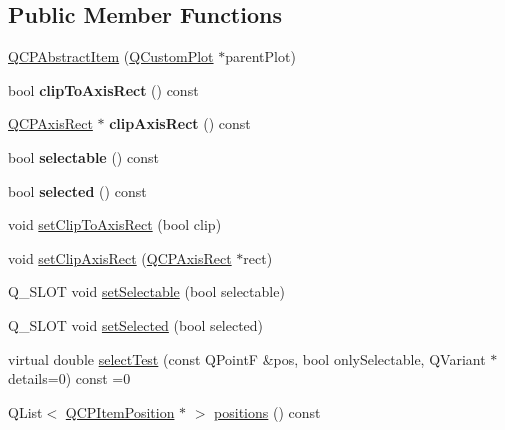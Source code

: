 \subsection*{Public Member Functions}
\begin{DoxyCompactItemize}
\item 
\mbox{\hyperlink{class_q_c_p_abstract_item_a9922507d8b4503a1fe1ed0b1030e23b6}{Q\+C\+P\+Abstract\+Item}} (\mbox{\hyperlink{class_q_custom_plot}{Q\+Custom\+Plot}} $\ast$parent\+Plot)
\item 
\mbox{\label{class_q_c_p_abstract_item_a42715ad5f3d7fca6854025fa5636f436}} 
bool {\bfseries clip\+To\+Axis\+Rect} () const
\item 
\mbox{\label{class_q_c_p_abstract_item_ae162314efd3fe1a6d4df11da1d275d52}} 
\mbox{\hyperlink{class_q_c_p_axis_rect}{Q\+C\+P\+Axis\+Rect}} $\ast$ {\bfseries clip\+Axis\+Rect} () const
\item 
\mbox{\label{class_q_c_p_abstract_item_ae29aa489767352b40c4aaa7ea50c5582}} 
bool {\bfseries selectable} () const
\item 
\mbox{\label{class_q_c_p_abstract_item_aa069fba320a13639f119f82ad29ead96}} 
bool {\bfseries selected} () const
\item 
void \mbox{\hyperlink{class_q_c_p_abstract_item_a39e05b9d4176b9accafc746d16ca6a06}{set\+Clip\+To\+Axis\+Rect}} (bool clip)
\item 
void \mbox{\hyperlink{class_q_c_p_abstract_item_a7dc75fcbcd10206fe0b75d757ea7a347}{set\+Clip\+Axis\+Rect}} (\mbox{\hyperlink{class_q_c_p_axis_rect}{Q\+C\+P\+Axis\+Rect}} $\ast$rect)
\item 
Q\+\_\+\+S\+L\+OT void \mbox{\hyperlink{class_q_c_p_abstract_item_a8a8e32a55bc478b849756a78c2d87fd2}{set\+Selectable}} (bool selectable)
\item 
Q\+\_\+\+S\+L\+OT void \mbox{\hyperlink{class_q_c_p_abstract_item_a203de94ad586cc44d16c9565f49d3378}{set\+Selected}} (bool selected)
\item 
virtual double \mbox{\hyperlink{class_q_c_p_abstract_item_a96d522d10ffc0413b9a366c6f7f0476b}{select\+Test}} (const Q\+PointF \&pos, bool only\+Selectable, Q\+Variant $\ast$details=0) const =0
\item 
Q\+List$<$ \mbox{\hyperlink{class_q_c_p_item_position}{Q\+C\+P\+Item\+Position}} $\ast$ $>$ \mbox{\hyperlink{class_q_c_p_abstract_item_a709f655ac3f7f22d452714134662b454}{positions}} () const

\end{DoxyCompactItemize}
